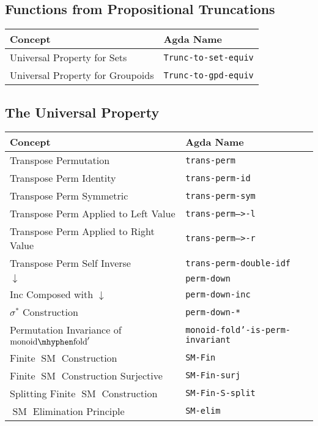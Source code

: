 \documentclass[12pt, parskip, DIV=14]{scrbook}
\newcommand{\SM}{\operatorname{SM}}
\newcommand{\monfold}{\operatorname{monoid\mhyphen fold}}
\begin{document}
\subsection{Functions from Propositional Truncations}

\begin{center}
\begin{tabular}{ll}
  Concept & Agda Name \\
  \hline
  Universal Property for Sets & \texttt{Trunc-to-set-equiv} \\
  Universal Property for Groupoids & \texttt{Trunc-to-gpd-equiv} \\
\end{tabular}
\end{center}

\subsection{The Universal Property}

\begin{center}
\begin{tabular}{ll}
  Concept & Agda Name \\
  \hline
  Transpose Permutation & \texttt{trans-perm} \\
  Transpose Perm Identity & \texttt{trans-perm-id} \\
  Transpose Perm Symmetric & \texttt{trans-perm-sym} \\
  Transpose Perm Applied to Left Value & \texttt{trans-perm-->-l} \\
  Transpose Perm Applied to Right Value & \texttt{trans-perm-->-r} \\
  Transpose Perm Self Inverse & \texttt{trans-perm-double-idf} \\
  $\downarrow$ & \texttt{perm-down} \\
  Inc Composed with $\downarrow$ & \texttt{perm-down-inc} \\
  $\sigma^*$ Construction & \texttt{perm-down-*} \\
  Permutation Invariance of $\monfold'$ & \texttt{monoid-fold'-is-perm-invariant} \\
  Finite $\SM$ Construction & \texttt{SM-Fin} \\
  Finite $\SM$ Construction Surjective & \texttt{SM-Fin-surj} \\
  Splitting Finite $\SM$ Construction & \texttt{SM-Fin-S-split} \\
  $\SM$ Elimination Principle & \texttt{SM-elim} \\
\end{tabular}
\end{center}
\end{document}
